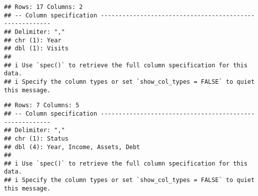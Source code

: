 \documentclass[
]{article}
\newenvironment{Shaded}{\begin{snugshade}}{\end{snugshade}}
\newcommand{\AttributeTok}[1]{\textcolor[rgb]{0.77,0.63,0.00}{#1}}
\newcommand{\CommentTok}[1]{\textcolor[rgb]{0.56,0.35,0.01}{\textit{#1}}}
\newcommand{\DecValTok}[1]{\textcolor[rgb]{0.00,0.00,0.81}{#1}}
\newcommand{\FunctionTok}[1]{\textcolor[rgb]{0.00,0.00,0.00}{#1}}
\newcommand{\NormalTok}[1]{#1}
\newcommand{\OtherTok}[1]{\textcolor[rgb]{0.56,0.35,0.01}{#1}}
\newcommand{\SpecialCharTok}[1]{\textcolor[rgb]{0.00,0.00,0.00}{#1}}
\newcommand{\StringTok}[1]{\textcolor[rgb]{0.31,0.60,0.02}{#1}}
\begin{document}
\begin{verbatim}
## Rows: 17 Columns: 2
## -- Column specification --------------------------------------------------------
## Delimiter: ","
## chr (1): Year
## dbl (1): Visits
## 
## i Use `spec()` to retrieve the full column specification for this data.
## i Specify the column types or set `show_col_types = FALSE` to quiet this message.
\end{verbatim}

\begin{Shaded}
\end{Shaded}

\begin{verbatim}
## Rows: 7 Columns: 5
## -- Column specification --------------------------------------------------------
## Delimiter: ","
## chr (1): Status
## dbl (4): Year, Income, Assets, Debt
## 
## i Use `spec()` to retrieve the full column specification for this data.
## i Specify the column types or set `show_col_types = FALSE` to quiet this message.
\end{verbatim}
\end{document}
